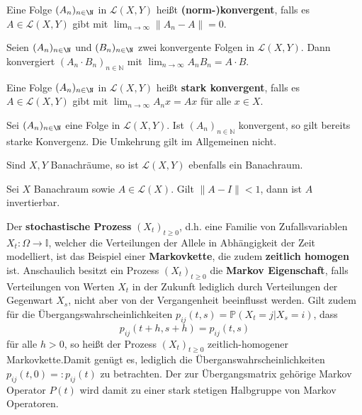 \begin{defi}[Normkonvergenz]
  Eine Folge $(A_n)_{n\in \N}$ in $\mathcal L(X,Y)$ heißt \textbf{(norm-)konvergent}, falls es $A\in\mathcal L(X,Y)$ gibt mit $\lim_{n\to\infty}\|A_n-A\|=0$.
\end{defi}

\begin{prop}
  Seien $(A_n)_{n\in \N}$ und $(B_n)_{n\in \N}$ zwei konvergente Folgen  in $\mathcal L(X,Y)$. Dann konvergiert $(A_n\cdot B_n)_{n\in\mathbb N}$ mit $\lim_{n\to\infty}A_n B_n = A\cdot B$.
\end{prop}


\begin{defi}
  Eine Folge $(A_n)_{n\in\N}$ in $\mathcal L(X,Y)$ heißt \textbf{stark konvergent}, falls es $A\in\mathcal L(X,Y)$ gibt mit $\lim_{n\to\infty} A_nx = Ax$ für alle $x\in X$.
\end{defi}

\begin{prop}
  Sei $(A_n)_{n\in \N}$ eine Folge in $\mathcal L(X,Y)$. Ist $(A_n)_{n\in\mathbb N}$ konvergent, so gilt bereits starke Konvergenz. Die Umkehrung gilt im Allgemeinen nicht. 
\end{prop}


\begin{prop}
  Sind $X,Y$ Banachräume, so ist $\mathcal L(X,Y)$ ebenfalls ein Banachraum.
\end{prop}


\begin{folg}
  Sei $X$ Banachraum sowie $A\in\mathcal L(X)$. Gilt $\|A-I\|< 1$, dann ist $A$ invertierbar. 
\end{folg}



Der \textbf{stochastische Prozess} $(X_t)_{t\geq0}$, d.h. eine Familie von Zufallsvariablen $X_t\colon \Omega\to \mathbb I$, welcher die Verteilungen der Allele in Abhängigkeit der Zeit modelliert, ist  das Beispiel einer \textbf{Markovkette}, die zudem \textbf{zeitlich homogen} ist.  Anschaulich besitzt ein Prozess $(X_t)_{t\geq0}$ die  \textbf{Markov Eigenschaft}, falls Verteilungen von Werten $X_t$ in der Zukunft lediglich durch Verteilungen der Gegenwart $X_s$, nicht aber von der Vergangenheit beeinflusst werden. Gilt zudem für die Übergangswahrscheinlichkeiten $p_{ij}(t,s)=\mathbb P(X_t=j|X_s=i)$, dass $$p_{ij}(t+h,s+h)=p_{ij}(t,s)$$ für alle $h>0$, so heißt der Prozess $(X_t)_{t\geq0}$ zeitlich-homogener Markovkette.Damit genügt es, lediglich die Überganswahrscheinlichkeiten $p_{ij}(t,0)=:p_{ij}(t)$ zu betrachten. Der zur Übergangsmatrix gehörige Markov Operator $P(t)$ wird damit zu einer stark stetigen Halbgruppe von Markov Operatoren.



